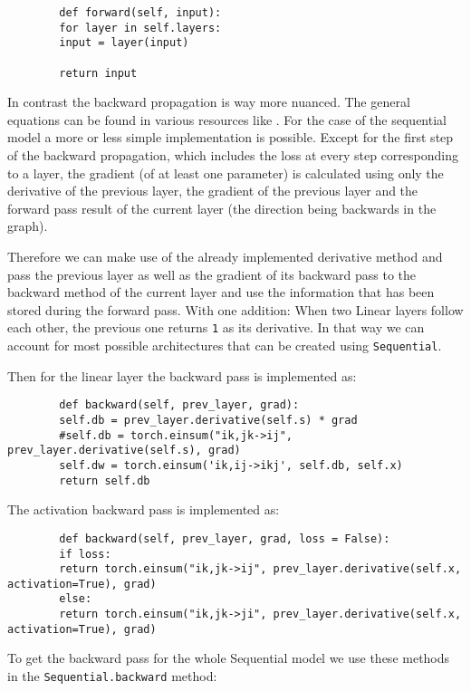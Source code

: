\documentclass[11pt,english]{article}
\begin{document}
	\begin{lstlisting}
		def forward(self, input):
		for layer in self.layers:
		input = layer(input)
		
		return input
	\end{lstlisting}

	In contrast the backward propagation is way more nuanced. The general equations can be found in various resources like \cite{Fleuret2022,Goodfellow-et-al-2016}. For the case of the sequential model a more or less simple implementation is possible. Except for the first step of the backward propagation, which includes the loss at every step corresponding to a layer, the gradient (of at least one parameter) is calculated using only the derivative of the previous layer, the gradient of the previous layer and the forward pass result of the current layer (the direction being backwards in the graph). 
	
	Therefore we can make use of the already implemented derivative method and pass the previous layer as well as the gradient of its backward pass to the backward method of the current layer and use the information that has been stored during the forward pass. With one addition: When two Linear layers follow each other, the previous one returns \lstinline|1| as its derivative. In that way we can account for most possible architectures that can be created using \lstinline|Sequential|.
	
	Then for the linear layer the backward pass is implemented as:
	
	\begin{lstlisting}
		def backward(self, prev_layer, grad):
		self.db = prev_layer.derivative(self.s) * grad
		#self.db = torch.einsum("ik,jk->ij", prev_layer.derivative(self.s), grad)
		self.dw = torch.einsum('ik,ij->ikj', self.db, self.x)
		return self.db
	\end{lstlisting} 
	
	The activation backward pass is implemented as:
	
	\begin{lstlisting}
		def backward(self, prev_layer, grad, loss = False):
		if loss:
		return torch.einsum("ik,jk->ij", prev_layer.derivative(self.x, activation=True), grad) 
		else:
		return torch.einsum("ik,jk->ji", prev_layer.derivative(self.x, activation=True), grad) 
	\end{lstlisting}

	To get the backward pass for the whole Sequential model we use these methods in the \lstinline|Sequential.backward| method:
	
\end{document}
